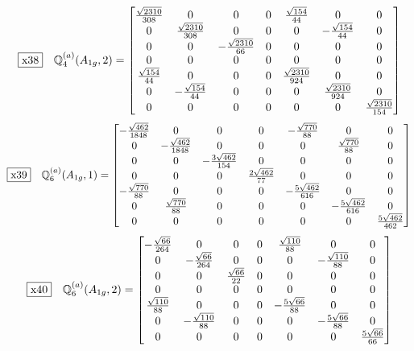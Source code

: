 \documentclass[fleqn,10pt,landscape]{jsarticle}
\begin{document}
\begin{dmath*}
\fbox{x38}\quad \mathbb{Q}_{4}^{(a)}(A_{1g},2)=\begin{bmatrix} \frac{\sqrt{2310}}{308} & 0 & 0 & 0 & \frac{\sqrt{154}}{44} & 0 & 0 \\ 0 & \frac{\sqrt{2310}}{308} & 0 & 0 & 0 & - \frac{\sqrt{154}}{44} & 0 \\ 0 & 0 & - \frac{\sqrt{2310}}{66} & 0 & 0 & 0 & 0 \\ 0 & 0 & 0 & 0 & 0 & 0 & 0 \\ \frac{\sqrt{154}}{44} & 0 & 0 & 0 & \frac{\sqrt{2310}}{924} & 0 & 0 \\ 0 & - \frac{\sqrt{154}}{44} & 0 & 0 & 0 & \frac{\sqrt{2310}}{924} & 0 \\ 0 & 0 & 0 & 0 & 0 & 0 & \frac{\sqrt{2310}}{154} \end{bmatrix}
\end{dmath*}
\begin{dmath*}
\fbox{x39}\quad \mathbb{Q}_{6}^{(a)}(A_{1g},1)=\begin{bmatrix} - \frac{\sqrt{462}}{1848} & 0 & 0 & 0 & - \frac{\sqrt{770}}{88} & 0 & 0 \\ 0 & - \frac{\sqrt{462}}{1848} & 0 & 0 & 0 & \frac{\sqrt{770}}{88} & 0 \\ 0 & 0 & - \frac{3 \sqrt{462}}{154} & 0 & 0 & 0 & 0 \\ 0 & 0 & 0 & \frac{2 \sqrt{462}}{77} & 0 & 0 & 0 \\ - \frac{\sqrt{770}}{88} & 0 & 0 & 0 & - \frac{5 \sqrt{462}}{616} & 0 & 0 \\ 0 & \frac{\sqrt{770}}{88} & 0 & 0 & 0 & - \frac{5 \sqrt{462}}{616} & 0 \\ 0 & 0 & 0 & 0 & 0 & 0 & \frac{5 \sqrt{462}}{462} \end{bmatrix}
\end{dmath*}
\begin{dmath*}
\fbox{x40}\quad \mathbb{Q}_{6}^{(a)}(A_{1g},2)=\begin{bmatrix} - \frac{\sqrt{66}}{264} & 0 & 0 & 0 & \frac{\sqrt{110}}{88} & 0 & 0 \\ 0 & - \frac{\sqrt{66}}{264} & 0 & 0 & 0 & - \frac{\sqrt{110}}{88} & 0 \\ 0 & 0 & \frac{\sqrt{66}}{22} & 0 & 0 & 0 & 0 \\ 0 & 0 & 0 & 0 & 0 & 0 & 0 \\ \frac{\sqrt{110}}{88} & 0 & 0 & 0 & - \frac{5 \sqrt{66}}{88} & 0 & 0 \\ 0 & - \frac{\sqrt{110}}{88} & 0 & 0 & 0 & - \frac{5 \sqrt{66}}{88} & 0 \\ 0 & 0 & 0 & 0 & 0 & 0 & \frac{5 \sqrt{66}}{66} \end{bmatrix}
\end{dmath*}
\end{document}
